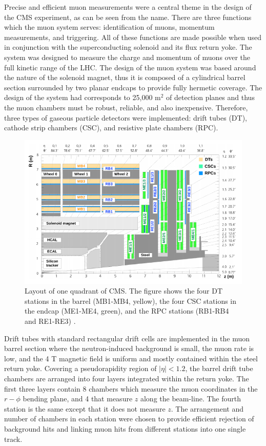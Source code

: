 Precise and efficient muon measurements were a central theme in the design of the CMS experiment, as can be seen from the name. There are three functions which the muon system serves: identification of muons, momentum measurements, and triggering. All of these functions are made  possible when used in conjunction with the superconducting solenoid and its flux return yoke. The system was designed to measure the charge and momentum of muons over the full kinetic range of the LHC. The design of the muon system was based around the nature of the solenoid magnet, thus it is composed of a cylindrical barrel section surrounded by two planar endcaps to provide fully hermetic coverage. The design of the system had corresponds to 25,000 m$^2$ of detection planes and thus the muon chambers must be robust, reliable, and also inexpensive. Therefore, three types of gaseous particle detectors were implemented: drift tubes (DT), cathode strip chambers (CSC), and resistive plate chambers (RPC). 

\begin{figure}\label{fig-CMSLongitudinalView}
\includegraphics[width=\textwidth]{Figures/CMSLongitudinalView.png}
\caption{Layout of one quadrant of CMS. The figure shows the four DT stations in the barrel (MB1-MB4, yellow), the four CSC stations in the endcap (ME1-ME4, green), and the RPC stations (RB1-RB4 and RE1-RE3) \cite{CMSexperiment}.}
\end{figure}

Drift tubes with standard rectangular drift cells are implemented in the muon barrel section where the neutron-induced background is small, the muon rate is low, and the 4 T magnetic field is uniform and mostly contained within the steel return yoke. Covering a pseudorapidity region of $|\eta|<1.2$, the barrel drift tube chambers are arranged into four layers integrated within the return yoke. The first three layers contain 8 chambers which measure the muon coordinates in the $r-\phi$ bending plane, and 4 that measure $z$ along the beam-line. The fourth station is the same except that it does not measure $z$. The arrangement and number of chambers in each station were chosen to provide efficient rejection of background hits and linking muon hits from different stations into one single track.

